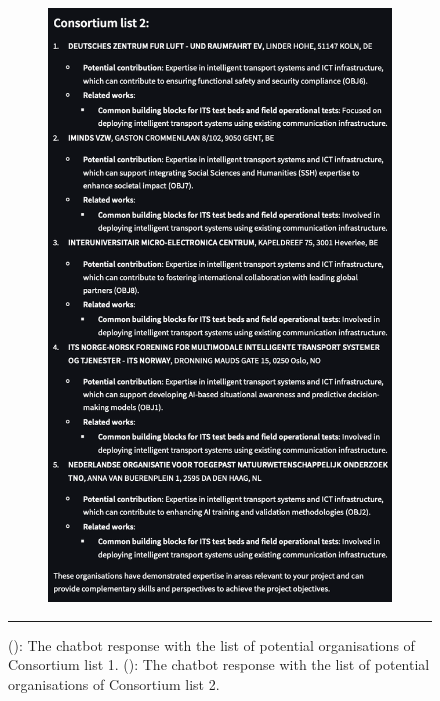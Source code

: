 \begin{figure}[h]
\begin{subfigure}{0.45\textwidth}
        \includegraphics[width=.6\textwidth]{figures/implementation/example-consortium-organisations-recommendation-answer-pt2.png}
        \caption{}
        \label{fig:example-consortium-organisations-recommendation-answer-pt2}
    \end{subfigure}
    \rule{35em}{0.5pt}
    \caption{(): The chatbot response with the list of potential organisations of Consortium list 1.
    (): The chatbot response with the list of potential organisations of Consortium list 2.}
    \label{fig:example-consortium-organisations-recommendation-answer}
\end{figure}